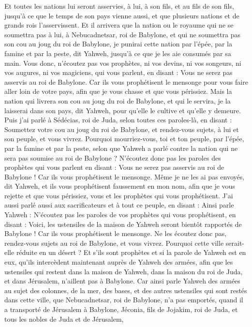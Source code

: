 \begin{multicols}{2}
Et toutes les nations lui seront asservies, à lui, à son fils, et au fils de son fils, jusqu'à ce que le temps de son pays vienne aussi, et que plusieurs nations et de grands rois l'asservissent.
Et il arrivera que la nation ou le royaume qui ne se soumettra pas à lui, à Nebucadnetsar, roi de Babylone, et qui ne soumettra pas son cou au joug du roi de Babylone, je punirai cette nation par l'épée, par la famine et par la peste, dit Yahweh, jusqu'à ce que je les aie consumés par sa main.
Vous donc, n'écoutez pas vos prophètes, ni vos devins, ni vos songeurs, ni vos augures, ni vos magiciens, qui vous parlent, en disant : Vous ne serez pas asservis au roi de Babylone.
Car ils vous prophétisent le mensonge pour vous faire aller loin de votre pays, afin que je vous chasse et que vous périssiez.
Mais la nation qui livrera son cou au joug du roi de Babylone, et qui le servira, je la laisserai dans son pays, dit Yahweh, pour qu'elle le cultive et qu'elle y demeure.
Puis j'ai parlé à Sédécias, roi de Juda, selon toutes ces paroles-là, en disant : Soumettez votre cou au joug du roi de Babylone, et rendez-vous sujets, à lui et son peuple, et vous vivrez.
Pourquoi mourriez-vous, toi et ton peuple, par l'épée, par la famine et par la peste, selon que Yahweh a parlé contre la nation qui ne sera pas soumise au roi de Babylone ?
N'écoutez donc pas les paroles des prophètes qui vous parlent en disant : Vous ne serez pas asservis au roi de Babylone ! Car ils vous prophétisent le mensonge.
Même je ne les ai pas envoyés, dit Yahweh, et ils vous prophétisent faussement en mon nom, afin que je vous rejette et que vous périssiez, vous et les prophètes qui vous prophétisent.
J'ai aussi parlé aussi aux sacrificateurs et à tout ce peuple, en disant : Ainsi parle Yahweh : N'écoutez pas les paroles de vos prophètes qui vous prophétisent, en disant : Voici, les ustensiles de la maison de Yahweh seront bientôt rapportés de Babylone ! Car ils vous prophétisent le mensonge.
Ne les écoutez donc pas, rendez-vous sujets au roi de Babylone, et vous vivrez. Pourquoi cette ville serait-elle réduite en un désert ?
Et s'ils sont prophètes et si la parole de Yahweh est en eux, qu'ils intercèdent maintenant auprès de Yahweh des armées, afin que les ustensiles qui restent dans la maison de Yahweh, dans la maison du roi de Juda, et dans Jérusalem, n'aillent pas à Babylone.
Car ainsi parle Yahweh des armées au sujet des colonnes, de la mer, des bases, et des autres ustensiles qui sont restés dans cette ville,
que Nebucadnetsar, roi de Babylone, n'a pas emportés, quand il a transporté de Jérusalem à Babylone, Jéconia, fils de Jojakim, roi de Juda, et tous les nobles de Juda et de Jérusalem,

\end{multicols}
